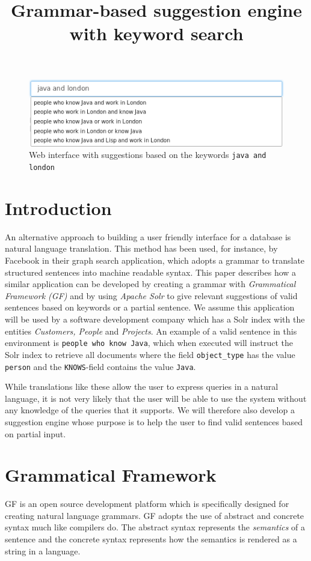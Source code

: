 \documentclass[10pt, a4paper]{article}
\title{Grammar-based suggestion engine with keyword search}
\begin{document}
\maketitleabstract

\begin{figure}[!b]
\centering
\includegraphics[scale=0.67]{./java-london.png}
\caption{Web interface with suggestions based on the keywords \texttt{java and london} \label{figure}}
\end{figure}

\section{Introduction}
An alternative approach to building a user friendly interface for 
a database is  natural language translation. This method has been used,
for instance, by Facebook \cite{li:2013} in 
their graph search application, which adopts a grammar to translate 
structured sentences into machine readable syntax. This paper describes 
how a similar application can be developed by creating a grammar 
with \emph{Grammatical Framework (GF)} \cite{ranta:2011} and 
by using \emph{Apache Solr} \cite{kuc:2011} to give relevant suggestions of valid sentences based on keywords or a partial sentence.
\newline
\newline
We assume this application will be used by a software development 
company which has a Solr index with the entities \emph{Customers, People} 
and \emph{Projects}. An example of a valid sentence in this environment is \texttt{people who know Java}, which when executed will instruct the Solr index to retrieve all documents where the field \texttt{object\_type} has the value \texttt{person} and the \texttt{KNOWS}-field contains the value \texttt{Java}. 

While translations like these allow the user to express queries in 
a natural language, it is not very likely that the user will be 
able to use the system without any knowledge of the queries that 
it supports. We will therefore also develop a suggestion engine 
whose purpose is to help the user to find valid sentences based on partial input.

\section{Grammatical Framework}
GF is an open source development platform which is specifically designed
for creating natural language grammars. GF adopts the use of abstract 
and concrete syntax much like compilers do. 
The abstract syntax represents the \emph{semantics} of a sentence and 
the concrete syntax represents how the semantics is rendered as a string
in a language. 
\end{document}
